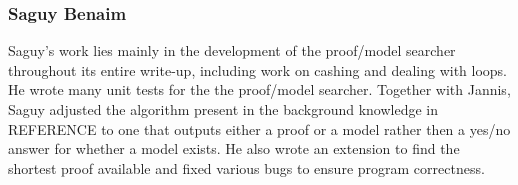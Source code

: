 \subsubsection*{Saguy Benaim}

Saguy's work lies mainly in the development of the proof/model searcher throughout its entire write-up, including work on cashing and dealing with loops. He wrote many unit tests for the the proof/model searcher. Together with Jannis, Saguy adjusted the algorithm present in the background knowledge in REFERENCE to one that outputs either a proof or a model rather then a yes/no answer for whether a model exists. He also wrote an extension to find the shortest proof available and fixed various bugs to ensure program correctness.

